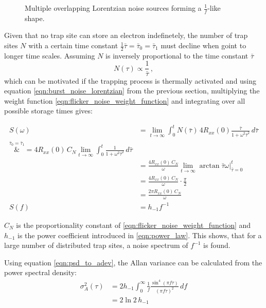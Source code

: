 \begin{figure}[hb]
    \centering
    
    \caption{Multiple overlapping Lorentzian noise sources forming a $\frac 1 f$-like shape.}
    \label{fig:flicker_noise_evelope}
\end{figure}

Given that no trap site can store an electron indefinetely, the number of trap sites $N$ with a certain time constant $\frac 1 2 \bar \tau = \bar \tau_0 = \bar \tau_1$ must decline when goint to longer time scales. Assuming $N$ is inversely proportional to the time constant $\bar \tau$
\begin{equation}
    N(\tau) \propto \frac{1}{\bar \tau}\,, \label{eqn:flicker_noise_weight_function}
\end{equation}
which can be motivated if the trapping process is thermally activated \cite{1_f_noise_motivation} and using equation \ref{eqn:burst_noise_lorentzian} from the previous section, multiplying the weight function \ref{eqn:flicker_noise_weight_function} and integrating over all possible storage times gives:

\begin{align}
    S(\omega) &= \lim_{t \to \infty} \int_0^t N(\bar \tau) \, 4 R_{xx}(0) \frac{\bar \tau}{1 + \omega^2 \bar \tau^2} \, d\bar\tau \nonumber\\
    \overset{\bar \tau_0 = \bar \tau_1}&{=} 4 R_{xx}(0)\, C_N \lim_{t \to \infty} \int_0^t \frac{1}{1 + \omega^2 \bar\tau^2} \, d\bar\tau \nonumber\\
    &= \frac{4 R_{xx}(0)\, C_N}{\omega} \lim_{t \to \infty}  \arctan{\bar\tau \omega} \Big|_{\bar\tau=0}^t \nonumber\\
    &= \frac{4 R_{xx}(0)\, C_N}{\omega} \cdot \frac{\pi}{2} \nonumber\\
    &= \frac{2 \pi R_{xx}(0)\, C_N}{\omega}\\
    S(f) &= h_{-1} f^{-1}
\end{align}

$C_N$ is the proportionality constant of \ref{eqn:flicker_noise_weight_function} and $h_{-1}$ is the power coefficient introduced in \ref{eqn:power_law}. This shows, that for a large number of distributed trap sites, a noise spectrum of $f^{-1}$ is found.

Using equation \ref{eqn:psd_to_adev}, the Allan variance can be calculated from the power spectral density:
\begin{align}
    \sigma_A^2(\tau) &= 2 h_{-1} \int_0^\infty \frac{1}{f} \frac{\sin^4\left( \pi f \tau \right)}{(\pi f \tau)^2}\,df \nonumber\\
    &=2 \ln 2 \, h_{-1}
\end{align}

